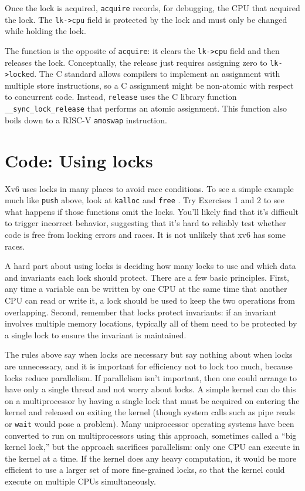 Once the lock is acquired,
\lstinline{acquire}
records, for debugging, the CPU 
that acquired the lock.
The
\lstinline{lk->cpu}
field is protected by the lock
and must only be changed while holding the lock.

The function
is the opposite of 
\lstinline{acquire}:
it clears the 
\lstinline{lk->cpu}
field
and then releases the lock.
Conceptually, the release just requires assigning zero to
\lstinline{lk->locked}.
The C standard allows compilers to implement an assignment
with multiple store instructions,
so a C assignment might be non-atomic with respect
to concurrent code.
Instead,
\lstinline{release}
uses the C library function
\lstinline{__sync_lock_release}
that performs an atomic assignment.
This function also boils down to a RISC-V
\lstinline{amoswap}
instruction.
\section{Code: Using locks}
Xv6 uses locks in many places to avoid race conditions.
To see a simple example much like
\lstinline{push}
above,
look at
\lstinline{kalloc}
and
\lstinline{free}
.
Try Exercises 1 and 2 to see what happens if those
functions omit the locks.
You'll likely find that it's difficult to trigger incorrect
behavior, suggesting that it's hard to reliably test whether code
is free from locking errors and races.
It is not unlikely that xv6 has some races.

A hard part about using locks is deciding how many locks
to use and which data and invariants each lock should protect.
There are a few basic principles.
First, any time a variable can be written by one CPU
at the same time that another CPU can read or write it,
a lock should be used to keep the two
operations from overlapping.
Second, remember that locks protect invariants:
if an invariant involves multiple memory locations,
typically all of them need to be protected
by a single lock to ensure the invariant is maintained.

The rules above say when locks are necessary but say nothing about when locks
are unnecessary, and it is important for efficiency not to lock too much,
because locks reduce parallelism.  If parallelism isn't important, then one
could arrange to have only a single thread and not worry about locks.  A simple
kernel can do this on a multiprocessor by having a single lock that must be
acquired on entering the kernel and released on exiting the kernel (though
system calls such as pipe reads or
\lstinline{wait}
would pose a problem).  Many uniprocessor operating systems have been converted to
run on multiprocessors using this approach, sometimes called a ``big
kernel lock,'' but the approach sacrifices parallelism: only one
CPU can execute in the kernel at a time.  If the kernel does any heavy
computation, it would be more efficient to use a larger set of more
fine-grained locks, so that the kernel could execute on multiple CPUs
simultaneously.


